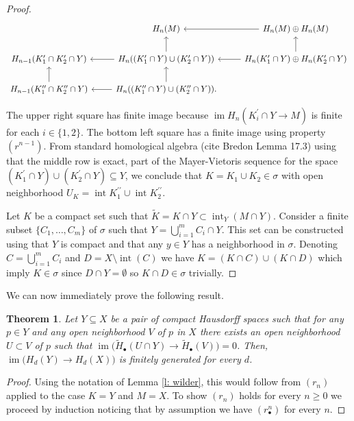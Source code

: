 \documentclass{amsart}
\newtheorem{theorem}{Theorem}
\newcommand{\dprime}{{\prime\prime}}
\DeclareMathOperator{\im}{im}
\DeclareMathOperator{\interior}{int}
\begin{document}
\begin{proof}
		\begin{equation*}
		\begin{tikzcd}
		& H_n(M) & \arrow[l] H_n(M) \oplus H_n(M) \\
		H_{n-1}(K_1^\prime \cap K_2^\prime \cap Y) & 
		H_{n}((K_1^\prime \cap Y) \cup (K_2^\prime \cap Y)) \arrow[l] \arrow[u] &
		H_{n}(K_1^\prime \cap Y) \oplus H_n(K_2^\prime \cap Y) \arrow[l] \arrow[u] \\
		H_{n-1}(K_1^\dprime \cap K_2^\dprime \cap Y) \arrow[u] & 
		H_{n}((K_1^\dprime \cap Y) \cup (K_2^\dprime \cap Y)) \arrow[l] \arrow[u]. &
		\end{tikzcd}
		\end{equation*}
		
		The upper right square has finite image because $\im H_n\left(K^\prime_i \cap Y \to M\right)$ is finite for each $i \in \{1, 2\}$. The bottom left square has a finite image using property $(r^{n-1})$. From standard homological algebra (cite Bredon 	Lemma 17.3) using that the middle row is exact, part of the Mayer-Vietoris sequence for the space $(K_1^\prime \cap Y) \cup (K_2^\prime \cap Y) \subseteq Y$, we conclude that $K = K_1 \cup K_2 \in \sigma$ with open neighborhood $U_K = \interior K^\dprime_1 \cup \interior K^\dprime_2$.
		
		Let $K$ be a compact set such that $\widetilde K = K \cap Y \subset \interior_Y(M \cap Y)$.
		Consider a finite subset $\{C_1, \dots, C_m\}$ of $\sigma$ such that $Y = \bigcup_{i=1}^m C_i \cap Y$. This set can be constructed using that $Y$ is compact and that any $y \in Y$ has a neighborhood in $\sigma$. Denoting $C = \bigcup_{i=1}^m C_i$ and $D = X \setminus \interior(C)$ we have $K = (K \cap C) \cup (K \cap D)$ which imply $K \in \sigma$ since $D \cap Y = \emptyset$ so $K \cap D \in \sigma$ trivially.
	\end{proof}
	
	We can now immediately prove the following result.
	
	\begin{theorem}
		Let $Y \subseteq X$ be a pair of compact Hausdorff spaces such that for any $p \in Y$ and any open neighborhood $V$ of $p$ in $X$ there exists an open neighborhood $U \subset V$ of $p$ such that $\im \big(\widetilde H_\bullet(U \cap Y) \to \widetilde H_\bullet(V)\big) = 0$. Then, $\im \big(H_d(Y) \to H_d(X)\big)$ is finitely generated for every $d$.
	\end{theorem}

	\begin{proof}
		Using the notation of Lemma \ref{l: wilder}, this would follow from $(r_n)$ applied to the case $K = Y$ and $M = X$. To show $(r_n)$ holds for every $n \geq 0$ we proceed by induction noticing that by assumption we have $(r^n_\bullet)$ for every $n$. 
	\end{proof}
\end{document}
